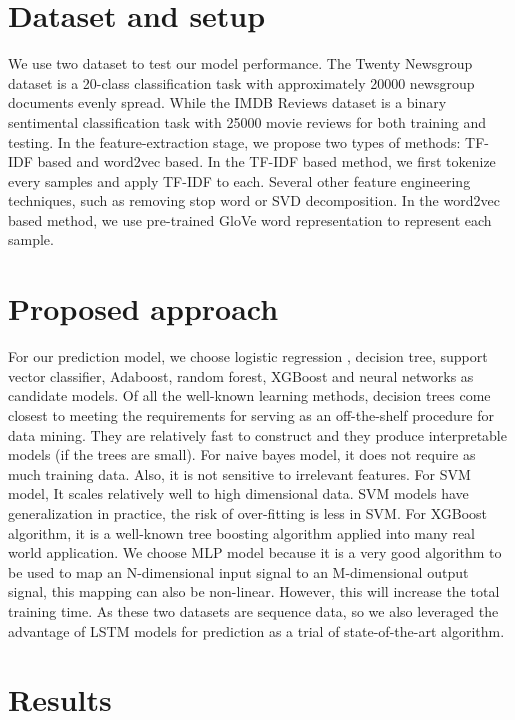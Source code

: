 \documentclass[11pt]{scrartcl}
\begin{document}
\section{Dataset and setup}
We use two dataset to test our model performance. The Twenty Newsgroup dataset is a 20-class classification task with approximately 20000 newsgroup documents evenly spread\cite{Lang95}. While the IMDB Reviews dataset is a binary sentimental classification task with 25000 movie reviews for both training and testing\cite{maas-EtAl:2011:ACL-HLT2011}. In the feature-extraction stage, we propose two types of methods: TF-IDF based and word2vec based. In the TF-IDF based method, we first tokenize every samples and apply TF-IDF to each. Several other feature engineering techniques, such as removing stop word or SVD decomposition. In the word2vec based method, we use pre-trained GloVe\cite{pennington2014glove} word representation to represent each sample.

\section{Proposed approach}
For our prediction model, we choose logistic regression , decision tree, support vector classifier, Adaboost, random forest, XGBoost and neural networks as candidate models. Of all the well-known learning methods, decision trees come closest to meeting the requirements for serving as an off-the-shelf procedure for data mining. They are relatively fast to construct and they produce interpretable models (if the trees are small). For naive bayes model, it does not require as much training data. Also, it is not sensitive to irrelevant features. For SVM model, It scales relatively well to high dimensional data. SVM models have generalization in practice, the risk of over-fitting is less in SVM. For XGBoost algorithm, it is a well-known tree boosting algorithm applied into many real world application. We choose MLP model because it is a very good algorithm to be used to map an N-dimensional input signal to an M-dimensional output signal, this mapping can also be non-linear. However, this will increase the total training time.  As these two datasets are sequence data, so we also leveraged the advantage of LSTM models for prediction as a trial of state-of-the-art algorithm.

\section{Results}
\end{document}
